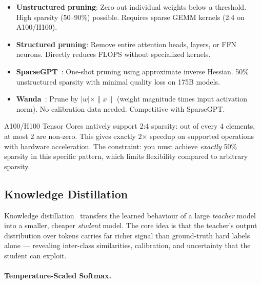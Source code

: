 \begin{keybox}
\begin{itemize}
  \item \textbf{Unstructured pruning}: Zero out individual weights below a threshold. High sparsity (50--90\%) possible. Requires sparse GEMM kernels (2:4 on A100/H100).
  \item \textbf{Structured pruning}: Remove entire attention heads, layers, or FFN neurons. Directly reduces FLOPS without specialized kernels.
  \item \textbf{SparseGPT}~\cite{frantar2023sparsegpt}: One-shot pruning using approximate inverse Hessian. 50\% unstructured sparsity with minimal quality loss on 175B models.
  \item \textbf{Wanda}~\cite{sun2024wanda}: Prune by $|w| \times \|x\|$ (weight magnitude times input activation norm). No calibration data needed. Competitive with SparseGPT.
\end{itemize}
\end{keybox}

\begin{warningbox}
A100/H100 Tensor Cores natively support 2:4 sparsity: out of every 4 elements, at most 2 are non-zero. This gives exactly 2$\times$ speedup on supported operations with hardware acceleration. The constraint: you must achieve \emph{exactly} 50\% sparsity in this specific pattern, which limits flexibility compared to arbitrary sparsity.
\end{warningbox}

\subsection{Knowledge Distillation}
\label{knowledge-distillation}

Knowledge distillation~\cite{hinton2015distilling} transfers the learned behaviour of a large \emph{teacher} model into a smaller, cheaper \emph{student} model. The core idea is that the teacher’s output distribution over tokens carries far richer signal than ground-truth hard labels alone --- revealing inter-class similarities, calibration, and uncertainty that the student can exploit.

\paragraph{Temperature-Scaled Softmax.}
\label{temperature-scaled-softmax.}

